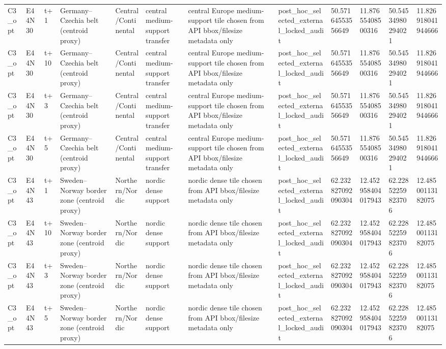 \begin{landscape}
\begin{longtable}{llllllllllll}
C3\_opt & E44N30 & t+1 & Germany–Czechia belt (centroid proxy) & Central/Continental & central medium-support transfer & central Europe medium-support tile chosen from API bbox/filesize metadata only & post\_hoc\_selected\_external\_locked\_audit & 50.57164553556649 & 11.87655408500316 & 50.54534980294021 & 11.826918041944666 \\
C3\_opt & E44N30 & t+10 & Germany–Czechia belt (centroid proxy) & Central/Continental & central medium-support transfer & central Europe medium-support tile chosen from API bbox/filesize metadata only & post\_hoc\_selected\_external\_locked\_audit & 50.57164553556649 & 11.87655408500316 & 50.54534980294021 & 11.826918041944666 \\
C3\_opt & E44N30 & t+3 & Germany–Czechia belt (centroid proxy) & Central/Continental & central medium-support transfer & central Europe medium-support tile chosen from API bbox/filesize metadata only & post\_hoc\_selected\_external\_locked\_audit & 50.57164553556649 & 11.87655408500316 & 50.54534980294021 & 11.826918041944666 \\
C3\_opt & E44N30 & t+5 & Germany–Czechia belt (centroid proxy) & Central/Continental & central medium-support transfer & central Europe medium-support tile chosen from API bbox/filesize metadata only & post\_hoc\_selected\_external\_locked\_audit & 50.57164553556649 & 11.87655408500316 & 50.54534980294021 & 11.826918041944666 \\
C3\_opt & E44N43 & t+1 & Sweden–Norway border zone (centroid proxy) & Northern/Nordic & nordic dense support & nordic dense tile chosen from API bbox/filesize metadata only & post\_hoc\_selected\_external\_locked\_audit & 62.232827092090304 & 12.452958404017943 & 62.22852259823706 & 12.48500113182075 \\
C3\_opt & E44N43 & t+10 & Sweden–Norway border zone (centroid proxy) & Northern/Nordic & nordic dense support & nordic dense tile chosen from API bbox/filesize metadata only & post\_hoc\_selected\_external\_locked\_audit & 62.232827092090304 & 12.452958404017943 & 62.22852259823706 & 12.48500113182075 \\
C3\_opt & E44N43 & t+3 & Sweden–Norway border zone (centroid proxy) & Northern/Nordic & nordic dense support & nordic dense tile chosen from API bbox/filesize metadata only & post\_hoc\_selected\_external\_locked\_audit & 62.232827092090304 & 12.452958404017943 & 62.22852259823706 & 12.48500113182075 \\
C3\_opt & E44N43 & t+5 & Sweden–Norway border zone (centroid proxy) & Northern/Nordic & nordic dense support & nordic dense tile chosen from API bbox/filesize metadata only & post\_hoc\_selected\_external\_locked\_audit & 62.232827092090304 & 12.452958404017943 & 62.22852259823706 & 12.48500113182075 \\

\end{longtable}
\end{landscape}
